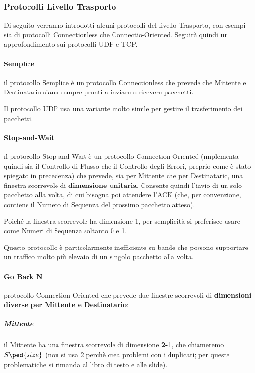 \documentclass[a4paper]{article}
\begin{document}
				\newpage					
										
				
			\subsubsection{Protocolli Livello Trasporto}
				
				Di seguito verranno introdotti alcuni protocolli del livello Trasporto, con esempi sia di protocolli Connectionless che Connectio-Oriented.
	Seguirà quindi un approfondimento sui protocolli UDP e TCP.
	
				\paragraph{Semplice}
					il protocollo Semplice è un protocollo Connectionless che prevede che Mittente e Destinatario siano sempre pronti a inviare o ricevere pacchetti.
					
					Il protocollo UDP usa una variante molto simile per gestire il trasferimento dei pacchetti.
					
				\paragraph{Stop-and-Wait}
					il protocollo Stop-and-Wait è un protocollo Connection-Oriented (implementa quindi sia il Controllo di Flusso che il Controllo degli Errori, proprio come è stato spiegato in precedenza) che prevede, sia per Mittente che per Destinatario, una finestra scorrevole di \textbf{dimensione unitaria}. Consente quindi l'invio di un solo pacchetto alla volta, di cui bisogna poi attendere l'ACK (che, per convenzione, contiene il Numero di Sequenza del prossimo pacchetto atteso).
					
					Poiché la finestra scorrevole ha dimensione 1, per semplicità si preferisce usare come Numeri di Sequenza soltanto 0 e 1.
					
					Questo protocollo è particolarmente inefficiente su bande che possono supportare un traffico molto più elevato di un singolo pacchetto alla volta.
					
				\paragraph{Go Back N}
					protocollo Connection-Oriented che prevede due finestre scorrevoli di \textbf{dimensioni diverse per Mittente e Destinatario}:
					
					\subparagraph{Mittente}
						il Mittente ha una finestra scorrevole di dimensione \textbf{2-1}, che chiameremo $S\ped{size} $ (non si usa 2 perchè crea problemi con i duplicati; per queste problematiche si rimanda al libro di testo e alle slide).
						
\end{document}
